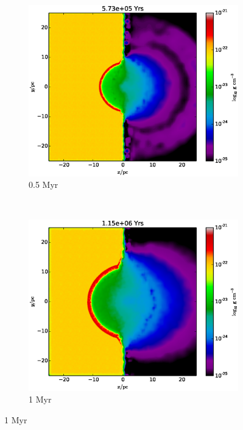 \begin{figure}
        \centering
        \begin{subfigure}[b]{0.3\textwidth}
                \includegraphics[width=\textwidth]{graphics/blister25600040rhoslice.eps}
                \caption{0.5 Myr}
                \label{fig:champagne1}
        \end{subfigure}
        ~ 
        \begin{subfigure}[b]{0.3\textwidth}
                \includegraphics[width=\textwidth]{graphics/blister25600080rhoslice.eps}
                \caption{1 Myr}

\end{subfigure}
\end{figure}
